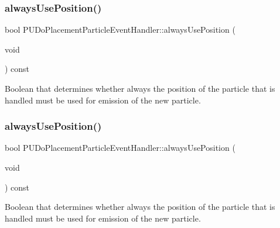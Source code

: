 \subsubsection{\texorpdfstring{always\+Use\+Position()}{alwaysUsePosition()}\hspace{0.1cm}{\footnotesize\ttfamily [1/2]}}
{\footnotesize\ttfamily bool P\+U\+Do\+Placement\+Particle\+Event\+Handler\+::always\+Use\+Position (\begin{DoxyParamCaption}\item[{void}]{ }\end{DoxyParamCaption}) const\hspace{0.3cm}{\ttfamily [inline]}}

Boolean that determines whether always the position of the particle that is handled must be used for emission of the new particle. \mbox{\label{classPUDoPlacementParticleEventHandler_a95a5ae60fc370645d6aae741235f03f0}} 
\subsubsection{\texorpdfstring{always\+Use\+Position()}{alwaysUsePosition()}\hspace{0.1cm}{\footnotesize\ttfamily [2/2]}}
{\footnotesize\ttfamily bool P\+U\+Do\+Placement\+Particle\+Event\+Handler\+::always\+Use\+Position (\begin{DoxyParamCaption}\item[{void}]{ }\end{DoxyParamCaption}) const\hspace{0.3cm}{\ttfamily [inline]}}

Boolean that determines whether always the position of the particle that is handled must be used for emission of the new particle. \mbox{\label{classPUDoPlacementParticleEventHandler_af78c199e7377b8ebc79940b8d4af2cf8}} 
